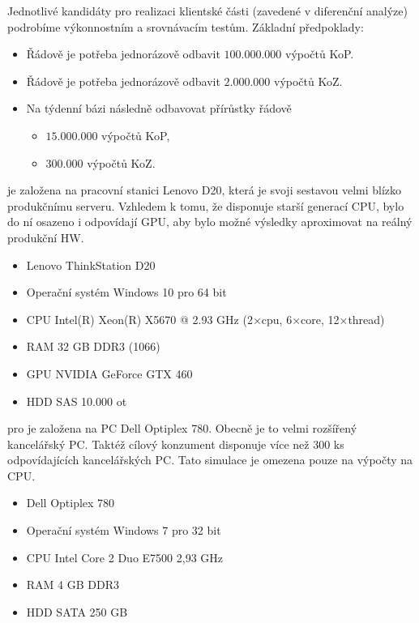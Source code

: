 Jednotlivé kandidáty pro realizaci klientské části (zavedené v diferenční analýze) podrobíme výkonnostním a srovnávacím testům.
Základní předpoklady:
\begin{itemize}
	\setlength{\parskip}{0pt}
	\setlength{\itemsep}{0pt}
	\item {Řádově je potřeba jednorázově odbavit $ 100.000.000 $ výpočtů KoP.}
	\item {Řádově je potřeba jednorázově odbavit $ 2.000.000 $ výpočtů KoZ.}
	\item {Na týdenní bázi následně odbavovat přírůstky řádově}
	\begin{itemize}
		\setlength{\parskip}{0pt}
		\setlength{\itemsep}{0pt}
		\item {$ 15.000.000 $ výpočtů KoP,}
		\item {$ 300.000 $ výpočtů KoZ}.
	\end{itemize}
\end{itemize}



je založena na pracovní stanici Lenovo D20, která je svoji sestavou velmi blízko produkčnímu serveru. Vzhledem k tomu, že disponuje starší generací CPU, bylo do ní osazeno i odpovídají GPU, aby bylo možné výsledky aproximovat na reálný produkční HW.
\begin{itemize}
	\setlength{\parskip}{0pt}
	\setlength{\itemsep}{0pt}
	\item {Lenovo ThinkStation D20}
	\item {Operační systém Windows 10 pro 64 bit}
    \item {CPU Intel(R) Xeon(R) X5670 @ 2.93 GHz (2×cpu, 6×core, 12×thread)}
    \item {RAM 32 GB DDR3 (1066)}
    \item {GPU NVIDIA GeForce GTX 460}
    \item {HDD SAS 10.000 ot}
\end{itemize}

pro je založena na PC Dell Optiplex 780. Obecně je to velmi rozšířený kancelářský PC. Taktéž cílový konzument disponuje více než 300 ks odpovídajících kancelářských PC. Tato simulace je omezena pouze na výpočty na CPU.
\begin{itemize}
	\setlength{\parskip}{0pt}
	\setlength{\itemsep}{0pt}
	\item {Dell Optiplex 780}
	\item {Operační systém Windows 7 pro 32 bit}
	\item {CPU Intel Core 2 Duo E7500 2,93 GHz}
	\item {RAM 4 GB DDR3}
	\item {HDD SATA 250 GB}
\end{itemize}

